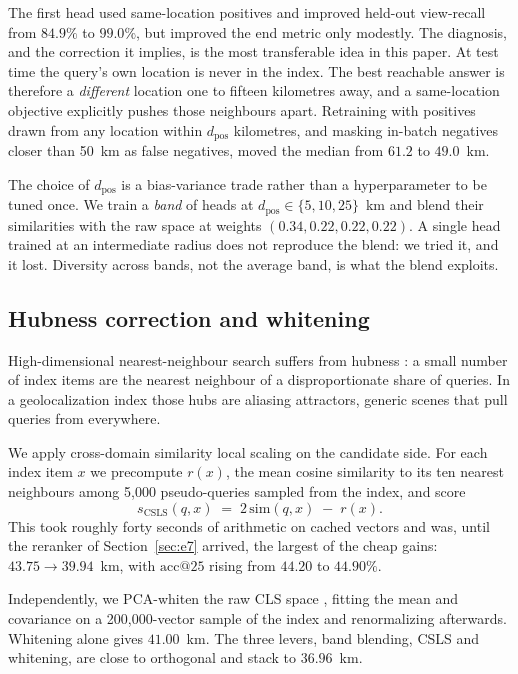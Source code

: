 \documentclass[11pt,a4paper]{article}
\begin{document}
The first head used same-location positives and improved held-out view-recall from $84.9\%$
to $99.0\%$, but improved the end metric only modestly. The diagnosis, and the correction it
implies, is the most transferable idea in this paper. At test time the query's own location
is never in the index. The best reachable answer is therefore a \emph{different} location one
to fifteen kilometres away, and a same-location objective explicitly pushes those neighbours
apart. Retraining with positives drawn from any location within $d_{\mathrm{pos}}$ kilometres,
and masking in-batch negatives closer than 50~km as false negatives, moved the median from
$61.2$ to $49.0$~km.

The choice of $d_{\mathrm{pos}}$ is a bias-variance trade rather than a hyperparameter to be
tuned once. We train a \emph{band} of heads at $d_{\mathrm{pos}} \in \{5, 10, 25\}$~km and
blend their similarities with the raw space at weights $(0.34, 0.22, 0.22, 0.22)$. A single
head trained at an intermediate radius does not reproduce the blend: we tried it, and it lost.
Diversity across bands, not the average band, is what the blend exploits.

\subsection{Hubness correction and whitening}

High-dimensional nearest-neighbour search suffers from hubness \cite{radovanovic2010hubs}: a
small number of index items are the nearest neighbour of a disproportionate share of queries.
In a geolocalization index those hubs are aliasing attractors, generic scenes that pull
queries from everywhere.

We apply cross-domain similarity local scaling \cite{conneau2018word} on the candidate side.
For each index item $x$ we precompute $r(x)$, the mean cosine similarity to its ten nearest
neighbours among 5{,}000 pseudo-queries sampled from the index, and score
\begin{equation}
s_{\mathrm{CSLS}}(q, x) \;=\; 2 \, \mathrm{sim}(q, x) \;-\; r(x).
\end{equation}
This took roughly forty seconds of arithmetic on cached vectors and was, until the reranker
of Section~\ref{sec:e7} arrived, the largest of the cheap gains: $43.75 \rightarrow
39.94$~km, with $\mathrm{acc@}25$ rising from $44.20$ to $44.90\%$.

Independently, we PCA-whiten the raw CLS space \cite{jegou2012negative}, fitting the mean and
covariance on a 200{,}000-vector sample of the index and renormalizing afterwards. Whitening
alone gives $41.00$~km. The three levers, band blending, CSLS and whitening, are close to
orthogonal and stack to $36.96$~km.
\end{document}
